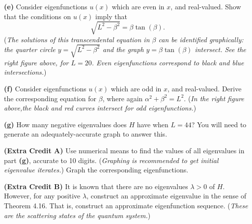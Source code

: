 \documentclass[12pt]{amsart}
\newcommand{\epart}[1]{\medskip\noindent\textbf{(#1)}\quad }
\begin{document}
\epart{e}  Consider eigenfunctions $u(x)$ which are even in $x$, and real-valued.  Show that the conditions on $u(x)$ imply that
	$$\sqrt{L^2-\beta^2} = \beta \tan(\beta).$$
(\emph{The solutions of this transcendental equation in $\beta$ can be identified graphically: the quarter circle $y=\sqrt{L^2-\beta^2}$ and the graph $y=\beta \tan(\beta)$ intersect.  See the right figure above, for $L=20$.  Even eigenfunctions correspond to black and blue intersections.})

\epart{f}  Consider eigenfunctions $u(x)$ which are odd in $x$, and real-valued.  Derive the corresponding equation for $\beta$, where again $\alpha^2+\beta^2=L^2$.  (\emph{In the right figure above,the black and red curves intersect for odd eigenfunctions.})

\epart{g}  How many negative eigenvalues does $H$ have when $L=44$?  You will need to generate an adequately-accurate graph to answer this.

\medskip
\epart{Extra Credit A}  Use numerical means to find the values of all eigenvalues in part \textbf{(g)}, accurate to 10 digits.  (\emph{Graphing is recommended to get initial eigenvalue iterates.})  Graph the corresponding eigenfunctions.

\epart{Extra Credit B}  It is known that there are no eigenvalues $\lambda>0$ of $H$.  However, for any positive $\lambda$, construct an approximate eigenvalue in the sense of Theorem 4.16.  That is, construct an approximate eigenfunction sequence.  (\emph{These are the \emph{scattering states} of the quantum system.})
\end{document}
